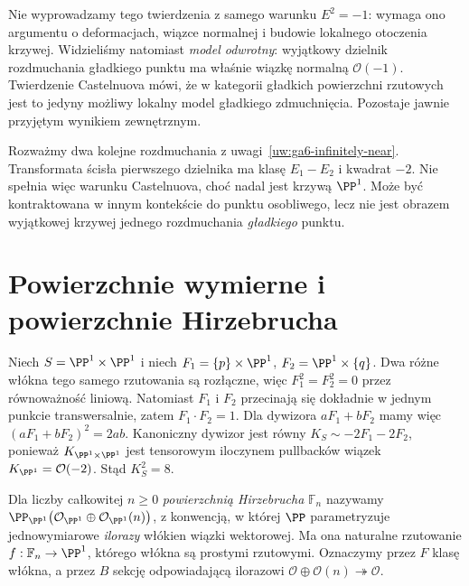 \begin{uwaga}
Nie wyprowadzamy tego twierdzenia z samego warunku
$E^2=-1$: wymaga ono argumentu o deformacjach,
wiązce normalnej i budowie lokalnego otoczenia krzywej.
Widzieliśmy natomiast \emph{model odwrotny}: wyjątkowy
dzielnik rozdmuchania gładkiego punktu ma właśnie
wiązkę normalną $\mathcal O(-1)$. Twierdzenie
Castelnuova mówi, że w kategorii gładkich powierzchni
rzutowych jest to jedyny możliwy lokalny model
gładkiego zdmuchnięcia. Pozostaje jawnie przyjętym
wynikiem zewnętrznym.
\end{uwaga}

\begin{przyklad}
Rozważmy dwa kolejne rozdmuchania z
uwagi~\ref{uw:ga6-infinitely-near}. Transformata
ścisła pierwszego dzielnika ma klasę $E_1-E_2$
i kwadrat $-2$. Nie spełnia więc warunku
Castelnuova, choć nadal jest krzywą $\PP^1$.
Może być kontraktowana w innym kontekście do
punktu osobliwego, lecz nie jest obrazem wyjątkowej
krzywej jednego rozdmuchania \emph{gładkiego} punktu.
\end{przyklad}

\section{Powierzchnie wymierne i powierzchnie Hirzebrucha}
\label{sec:ga6-rational}

\begin{przyklad}
Niech $S=\PP^1\times\PP^1$ i niech
$F_1=\{p\}\times\PP^1$, $F_2=\PP^1\times\{q\}$.
Dwa różne włókna tego samego rzutowania są rozłączne,
więc $F_1^2=F_2^2=0$ przez równoważność liniową.
Natomiast $F_1$ i $F_2$ przecinają się dokładnie
w jednym punkcie transwersalnie, zatem
$F_1\cdot F_2=1$. Dla dywizora $aF_1+bF_2$
mamy więc $(aF_1+bF_2)^2=2ab$.
Kanoniczny dywizor jest równy
$K_S\sim-2F_1-2F_2$, ponieważ
$K_{\PP^1\times\PP^1}$ jest tensorowym iloczynem
pullbacków wiązek $K_{\PP^1}=\mathcal O(-2)$.
Stąd $K_S^2=8$.
\end{przyklad}

\begin{definicja}
Dla liczby całkowitej $n\ge0$ \emph{powierzchnią
Hirzebrucha} $\mathbb F_n$ nazywamy
$\PP_{\PP^1}\bigl(\mathcal O_{\PP^1}\oplus
\mathcal O_{\PP^1}(n)\bigr)$, z konwencją, w której
$\PP$ parametryzuje jednowymiarowe \emph{ilorazy}
włókien wiązki wektorowej. Ma ona naturalne rzutowanie
$f:\mathbb F_n\to\PP^1$, którego włókna są prostymi
rzutowymi. Oznaczymy przez $F$ klasę włókna,
a przez $B$ sekcję odpowiadającą ilorazowi
$\mathcal O\oplus\mathcal O(n)\twoheadrightarrow\mathcal O$.
\end{definicja}

